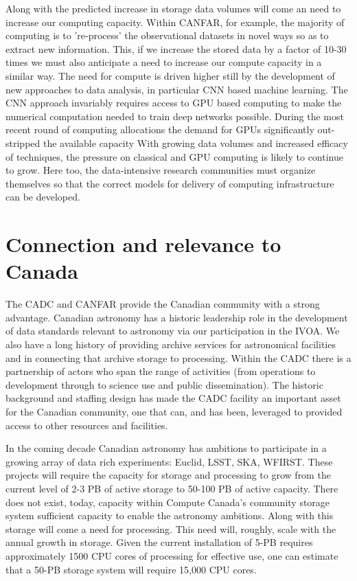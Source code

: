 \documentclass[11pt]{article}
\begin{document}
Along with the predicted increase in storage data volumes will come an need to increase our computing capacity.  Within CANFAR, for example, the majority of computing is to 're-process' the observational datasets in novel ways so as to extract new information.  This, if we increase the stored data by a factor of 10-30 times we must also anticipate a need to increase our compute capacity in a similar way.  The need for compute is driven higher still by the development of new approaches to data analysis, in particular CNN based machine learning.  The CNN approach invariably requires access to GPU based computing to make the numerical computation needed to train deep networks possible. During the most recent round of computing allocations the demand for GPUs significantly out-stripped the available capacity  With growing data volumes and increased efficacy of techniques, the pressure on classical and GPU computing is likely to continue to grow.  Here too, the data-intensive research communities must organize themselves so that the correct models for delivery of computing infrastructure can be developed.


\section{Connection and relevance to Canada}
The CADC and CANFAR  provide the Canadian community with a strong advantage.
Canadian astronomy has a historic leadership role in the development of data standards relevant to astronomy via our participation in the IVOA.  We also have a long history of providing archive services for astronomical facilities and in connecting that archive storage to processing.  Within the CADC there is a partnership of actors who span the range of activities (from operations to development through to science use and public dissemination).  The historic background and staffing design has made the CADC facility an important asset for the Canadian community, one that can, and has been, leveraged to provided access to other resources and facilities. 

In the coming decade Canadian astronomy has ambitions to participate in a growing array of data rich experiments:  Euclid, LSST, SKA, WFIRST.  These projects will require the capacity for storage and processing to grow from the current level of 2-3 PB of active storage to 50-100 PB of active capacity.  There does not exist, today, capacity within  Compute Canada's community storage system sufficient capacity to enable the astronomy ambitions.     Along with this storage will come a need for processing.  This need will, roughly, scale with the annual growth in storage.   Given the current installation of 5-PB requires approximately 1500 CPU cores of processing for effective use, one can estimate that a 50-PB storage system will require 15,000 CPU cores.  
\end{document}

